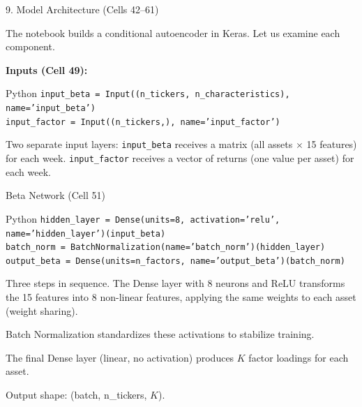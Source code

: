 \documentclass[aspectratio=169, 11pt]{beamer}
\begin{document}
\begin{frame}{9. Model Architecture (Cells 42--61)}

The notebook builds a conditional autoencoder in Keras. Let us examine each component.


\vspace{0.3cm}

\textbf{Inputs (Cell 49):}

\vspace{0.2cm}

\begin{block}{Python}
\texttt{input\_beta = Input((n\_tickers, n\_characteristics), name='input\_beta') \\
input\_factor = Input((n\_tickers,), name='input\_factor')
}
\end{block}

\vspace{0.3cm}

Two separate input layers: \texttt{input\_beta} receives a matrix (all assets $\times$ 15 features) for each week. \texttt{input\_factor} receives a vector of returns (one value per asset) for each week.

\end{frame}
%
%
\begin{frame}{Beta Network (Cell 51)}

\begin{block}{Python}
\small
\texttt{hidden\_layer = Dense(units=8, activation='relu', name='hidden\_layer')(input\_beta) \\
batch\_norm = BatchNormalization(name='batch\_norm')(hidden\_layer) \\
output\_beta = Dense(units=n\_factors, name='output\_beta')(batch\_norm)
}
\end{block}

\vspace{0.3cm}

Three steps in sequence. The Dense layer with 8 neurons and ReLU transforms the 15 features into 8 non-linear features, applying the same weights to each asset (weight sharing).

\vspace{0.3cm}

Batch Normalization standardizes these activations to stabilize training.

\vspace{0.3cm}

The final Dense layer (linear, no activation) produces $K$ factor loadings for each asset.

\vspace{0.3cm}

Output shape: (batch, n\_tickers, $K$).

\end{frame}
\end{document}
